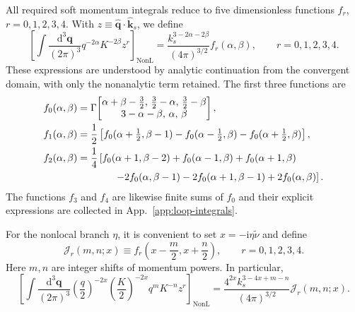 \documentclass[a4paper,12pt]{article}
\def\di{{\mathrm{d}}}
\def\mb{\mathbf}
\def\ii{\mathrm{i}}
\begin{document}
All required soft momentum integrals reduce to five dimensionless functions $f_r$, $r=0,1,2,3,4$.
With $z\equiv\widehat{\mb q}\cdot\widehat{\mb k}_s$, we define
\begin{equation}
    \left[ \int\frac{\di^3\mb q}{(2\pi)^3}
    q^{-2\alpha}K^{-2\beta}z^r \right]_{\mathrm{NonL}}
    =\frac{k_s^{3-2\alpha-2\beta}}{(4\pi)^{3/2}}
    f_r(\alpha,\beta),\qquad r=0,1,2,3,4.
    \label{eq:fr-definition}
\end{equation}
These expressions are understood by analytic continuation from the convergent domain, with only the nonanalytic term retained.
The first three functions are
\begin{align}
    f_0(\alpha,\beta)
    &=\Gamma\!\left[\begin{matrix}
        \alpha+\beta-\tfrac32,\,\tfrac32-\alpha,\,\tfrac32-\beta\\
        3-\alpha-\beta,\,\alpha,\,\beta
    \end{matrix}\right],
    \label{eq:f0}\\
    f_1(\alpha,\beta)
    &=\frac12\left[
    f_0(\alpha+\tfrac12,\beta-1)
    -f_0(\alpha-\tfrac12,\beta)
    -f_0(\alpha+\tfrac12,\beta)\right],
    \label{eq:f1}\\
    f_2(\alpha,\beta)
    &=\frac14\left[
    f_0(\alpha+1,\beta-2)+f_0(\alpha-1,\beta)
    +f_0(\alpha+1,\beta)\right.\nonumber\\
    &\hspace{13mm}\left.
    -2f_0(\alpha,\beta-1)-2f_0(\alpha+1,\beta-1)
    +2f_0(\alpha,\beta)\right].
    \label{eq:f2}
\end{align}
The functions $f_3$ and $f_4$ are likewise finite sums of $f_0$ and their explicit expressions are collected in App.~\ref{app:loop-integrals}.

For the nonlocal branch $\eta$, it is convenient to set $x=-\ii\eta\tilde\nu$ and define
\begin{equation}
    \mathcal J_r(m,n;x)
    \equiv f_r\left(x-\frac m2,x+\frac n2\right),
    \qquad r=0,1,2,3,4.
    \label{eq:Jr-definition}
\end{equation}
Here $m,n$ are integer shifts of momentum powers.
In particular,
\begin{equation}
    \left[
    \int\frac{\di^3\mb q}{(2\pi)^3}
    \left(\frac q2\right)^{-2x}
    \left(\frac K2\right)^{-2x}q^mK^{-n}z^r
    \right]_{\mathrm{NonL}}
    =\frac{4^{2x}k_s^{3-4x+m-n}}{(4\pi)^{3/2}}
    \mathcal J_r(m,n;x).
    \label{eq:Jr-normalization}
\end{equation}
\end{document}
